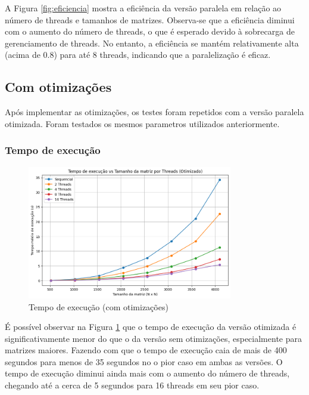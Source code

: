 \documentclass[12pt, a4paper]{article}
\begin{document}
	A Figura \ref{fig:eficiencia} mostra a eficiência da versão paralela em relação ao número de threads e tamanhos de matrizes.
	Observa-se que a eficiência diminui com o aumento do número de threads, o que é esperado devido à sobrecarga de gerenciamento de threads. No entanto, a eficiência se mantém relativamente alta (acima de 0.8) para até 8 threads, indicando que a paralelização é eficaz.

	\subsection{Com otimizações}

	Após implementar as otimizações, os testes foram repetidos com a versão paralela otimizada. Foram testados
	os mesmos parametros utilizados anteriormente.

	\subsubsection{Tempo de execução}

	\begin{figure}[H]
		\centering
		\includegraphics[width=0.8\textwidth]{img/execution-time-opt.png}
		\caption{Tempo de execução (com otimizações)}
		\label{fig:tempo_execucao_otimizado}
	\end{figure}

	É possível observar na Figura \ref{fig:tempo_execucao_otimizado} que o tempo de execução da versão otimizada é
	significativamente menor do que o da versão sem otimizações, especialmente para matrizes maiores. 
	Fazendo com que o tempo de execução caia de mais de 400 segundos para menos de 35 segundos no o pior caso
	em ambas as versões. O tempo de execução diminui ainda mais com o aumento do número de threads, chegando até
	a cerca de 5 segundos para 16 threads em seu pior caso.
\end{document}
